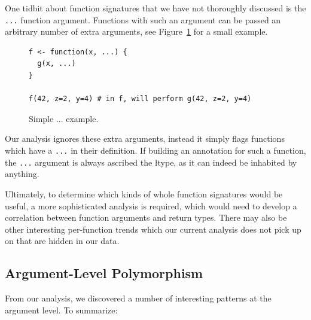 \documentclass[acmsmall,10pt,review,anonymous]{acmart}\settopmatter{printfolios=true,printccs=false,printacmref=false}
\begin{document}
One tidbit about function signatures that we have not thoroughly discussed is the {\tt ...} function argument.
Functions with such an argument can be passed an arbitrary number of extra arguments, see Figure~\ref{fig:dotdotdot} for a small example.

\begin{figure}[!hb]{\small\begin{lstlisting}[style=R]
f <- function(x, ...) {
  g(x, ...)
}

f(42, z=2, y=4) # in f, will perform g(42, z=2, y=4)

\end{lstlisting}}\caption{Simple ... example.}\label{fig:dotdotdot}\end{figure}

Our analysis ignores these extra arguments, instead it simply flags functions which have a {\tt ...} in their definition.
If building an annotation for such a function, the {\tt ...} argument is always ascribed the \l type, as it can indeed be inhabited by anything.

Ultimately, to determine which kinds of whole function signatures would be useful, a more sophisticated analysis is required, which would need to develop a correlation between function arguments and return types.
There may also be other interesting per-function trends which our current analysis does not pick up on that are hidden in our data.

%
%
%
%
\subsection{Argument-Level Polymorphism}

From our analysis, we discovered a number of interesting patterns at the argument level.
To summarize:
\end{document}
